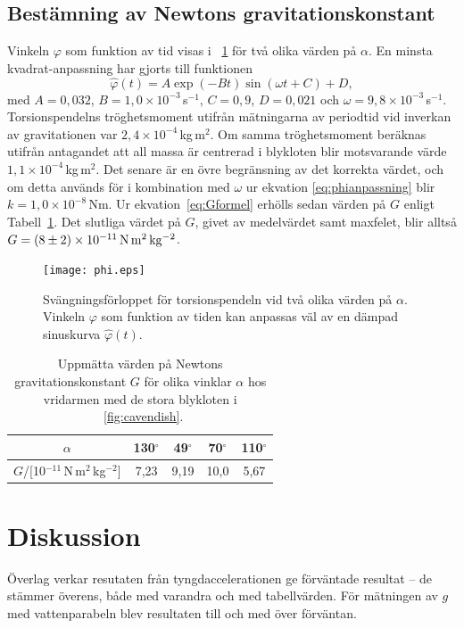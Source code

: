 \documentclass[11pt,a4paper]{article}
\newcommand{\figref}{\figurename~\ref}
\begin{document}
\subsection{Bestämning av Newtons gravitationskonstant}
Vinkeln $\varphi$ som funktion av tid visas i \figref{fig:phi} för två olika värden på $\alpha$. En minsta kvadrat-anpassning har gjorts till funktionen
\begin{equation}
\widehat\varphi(t) = A\exp(-Bt)\sin(\omega t+C)+D,
\label{eq:phianpassning}
\end{equation}
med $A=0,032$, $B=1,0\times 10^{-3}$\,s$^{-1}$, $C=0,9$, $D=0,021$ och $\omega=9,8\times10^{-3}$\,s$^{-1}$. Torsionspendelns tröghetsmoment utifrån mätningarna av periodtid vid inverkan av gravitationen var $2,4\times10^{-4}$\,kg\,m$^2$. Om samma tröghetsmoment beräknas utifrån antagandet att all massa är centrerad i blykloten blir motsvarande värde $1,1\times10^{-4}$\,kg\,m$^2$. Det senare är en övre begränsning av det korrekta värdet, och om detta används för i kombination med $\omega$ ur ekvation \eqref{eq:phianpassning} blir $k=1,0\times10^{-8}$\,Nm. Ur ekvation~\eqref{eq:Gformel} erhölls sedan värden på $G$ enligt Tabell~\ref{tab:G}. Det slutliga värdet på $G$, givet av medelvärdet samt maxfelet, blir alltså $G=\unit[(8\pm2)\times 10^{-11}]{N\,m^2\,kg^{-2}}$.

\begin{figure}%
\centering
\texttt{[image: phi.eps]}
\caption{Svängningsförloppet för torsionspendeln vid två olika värden på $\alpha$. Vinkeln $\varphi$ som funktion av tiden kan anpassas väl av en dämpad sinuskurva $\widehat\varphi(t)$.}
\label{fig:phi}
\end{figure}

\begin{table}%
\centering
\caption{Uppmätta värden på Newtons gravitationskonstant $G$ för olika vinklar $\alpha$ hos vridarmen med de stora blykloten i \figref{fig:cavendish}.}
\begin{tabular}{|c|c|c|c|c|} \hline
$\alpha$ & 130$^\circ$ & 49$^\circ$ & 70$^\circ$ & 110$^\circ$ \\ \hline
$G$/[10$^{-11}$\,N\,m$^2$\,kg$^{-2}$] & 7,23 & 9,19 & 10,0 & 5,67 \\ \hline  
\end{tabular}
\label{tab:G}
\end{table}




\section{Diskussion}
Överlag verkar resutaten från tyngdaccelerationen ge förväntade resultat -- de stämmer överens, både med varandra och med tabellvärden. För mätningen av $g$ med vattenparabeln blev resultaten till och med över förväntan.
\end{document}
